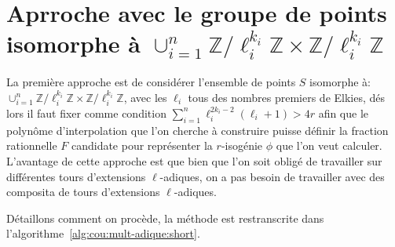 \documentclass[10pt,a4paper]{book}
\theoremstyle{plain}
\theoremstyle{definition}
\theoremstyle{definition}
\theoremstyle{definition}
\theoremstyle{definition}
\theoremstyle{remark}
\theoremstyle{remark}
\theoremstyle{definition}
\begin{document}
\section{Aprroche avec le groupe de points isomorphe à $\cup_{i=1}^n \mathbb{Z}/\ell_i^{k_i} \mathbb{Z} \times \mathbb{Z}/\ell_i^{k_i} \mathbb{Z}$}
La première approche est de considérer l'ensemble de points $S$ isomorphe à: 
$\cup_{i=1}^n \mathbb{Z}/\ell_i^{k_i} \mathbb{Z} \times \mathbb{Z}/\ell_i^{k_i} \mathbb{Z} $,
avec les $\ell_i$ tous des nombres premiers de Elkies, dés lors il faut fixer comme 
condition  $\sum_{i=1}^n\ell_i^{2k_{i}-2}(\ell_i+1)>4r$
afin que le polynôme d'interpolation que l'on cherche à construire puisse 
définir la fraction rationnelle $F$ candidate pour représenter la $r$-isogénie 
$\phi$ que l'on veut calculer. 
L'avantage de cette approche est que bien que l'on soit obligé de travailler
sur différentes tours d'extensions $\ell$-adiques, on a pas besoin de 
travailler avec des composita de tours d'extensions $\ell$-adiques.

Détaillons comment on procède, la méthode est restranscrite dans 
l'algorithme~\ref{alg:cou:mult-adique:short}.%
\end{document}
